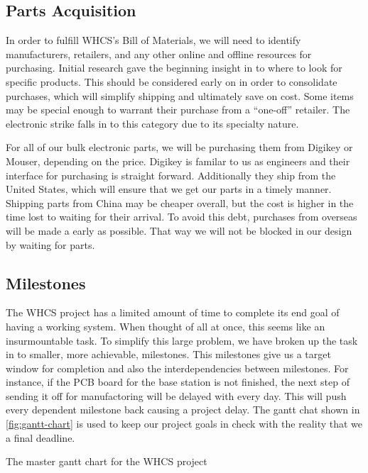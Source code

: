 \subsection{Parts Acquisition}
In order to fulfill WHCS's Bill of Materials, we will need to identify
manufacturers, retailers, and any other online and offline resources for
purchasing. Initial research gave the beginning insight in to where to look for
specific products. This should be considered early on in order to consolidate
purchases, which will simplify shipping and ultimately save on cost. Some items
may be special enough to warrant their purchase from a ``one-off'' retailer.
The electronic strike falls in to this category due to its specialty nature.

For all of our bulk electronic parts, we will be purchasing them from Digikey
or Mouser, depending on the price. Digikey is familar to us as engineers and
their interface for purchasing is straight forward. Additionally they ship from
the United States, which will ensure that we get our parts in a timely manner.
Shipping parts from China may be cheaper overall, but the cost is higher in the
time lost to waiting for their arrival. To avoid this debt, purchases from
overseas will be made a early as possible. That way we will not be blocked in
our design by waiting for parts.

\subsection{Milestones}
The WHCS project has a limited amount of time to complete its end goal of
having a working system. When thought of all at once, this seems like an
insurmountable task. To simplify this large problem, we have broken up the task
in to smaller, more achievable, milestones. This milestones give us a target
window for completion and also the interdependencies between milestones. For
instance, if the PCB board for the base station is not finished, the next step
of sending it off for manufactoring will be delayed with every day. This will
push every dependent milestone back causing a project delay. The gantt chat
shown in \autoref{fig:gantt-chart} is used to keep our project goals in check
with the reality that we a final deadline.

{The master gantt chart for the WHCS project}

